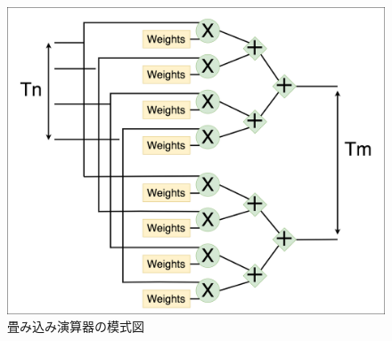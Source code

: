 {\begin{figure}[h]
    \centering
    \includegraphics[width=12cm]{./chap6/fig/ucla_pe.png}
    \caption{畳み込み演算器の模式図}
    \label{fig:para_inception}
\end{figure}
}

